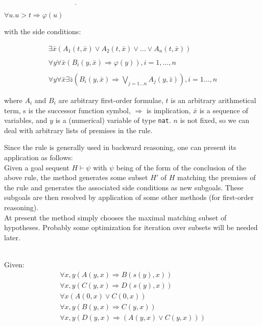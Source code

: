 \vspace{-1mm}
$\underline{\qquad\qquad\qquad\qquad\qquad\qquad\qquad\qquad\qquad\qquad}$
 
\vspace{1mm}
$\forall u. u > t \Rightarrow \varphi(u)$ 

\vspace{5mm}
\noindent
with the side conditions: 

\[\begin{array}{l} 
\exists \bar{x}  (A_{1}(t,\bar{x}) \vee A_{2}(t, \bar{x}) \vee \ldots \vee 
A_{n}(t,\bar{x})) \\
\\
\forall y \forall \bar{x} (B_{i}(y, \bar{x}) \Rightarrow \varphi(y)) , i=1, \ldots, n \\
\\
\forall y \forall \bar{x} \exists \bar{z} ( B_{i}(y, \bar{x}) 
\Rightarrow \bigvee_{j=1\ldots n} A_{j}(y,\bar{z})) ,  i=1 \ldots, n 
\end{array}\]

\noindent
where $A_{i}$ and $B_{i}$ are arbitrary first-order formulae, $t$ is
an arbitrary arithmetical term, s is the successor function symbol,
$\Rightarrow$ is implication, $\bar{x}$ is a sequence of
variables, and $y$ is a (numerical) variable of type \texttt{nat}.  $n$ is
not fixed, so we can deal with arbitrary lists of premises in the rule.

\noindent
Since the rule is generally used in backward reasoning, 
one can present its application as follows: \\

\noindent
Given a goal sequent $H \vdash \psi$ with $\psi$ being of the form of
the conclusion of the above rule, the method generates some subset
$H'$ of $H$ matching the premises of the rule and generates the
associated side conditions as new subgoals.  These subgoals are
then resolved by application of some other methods (for first-order
reasoning). \\

\noindent
At present the method simply chooses the maximal matching subset of
hypotheses.  Probably some optimization for iteration over subsets
will be needed later.

 \\

Given:   
\[\begin{array}{l}
\forall x, y (A(y,x) \Rightarrow B(s(y),x)) \\
\forall x, y (C(y,x) \Rightarrow D(s(y),x)) \\
\forall x (A(0,x) \lor C(0,x)) \\
\forall x,y (B(y,x) \Rightarrow C(y,x)) \\
\forall x,y (D(y,x) \Rightarrow (A(y,x) \lor C(y,x))) 
\end{array}\]

